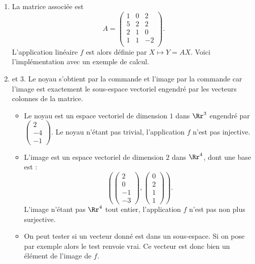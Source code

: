\documentclass[class=report,crop=false]{standalone}
\begin{document}
\begin{enumerate}
  \item La matrice associée est
  $$A = \begin{pmatrix}1&0&2\\5&2&2\\2&1&0\\1&1&-2\\\end{pmatrix}.$$
  L'application linéaire $f$ est alors définie par $X \mapsto Y = AX$.
  Voici l'implémentation avec un exemple de calcul. 
 
  \item et 3.
  Le noyau s'obtient par la commande  et l'image par la commande
   car l'image est
  exactement le sous-espace vectoriel engendré par les vecteurs colonnes de la matrice.
  
  \begin{itemize}
    \item Le noyau est un espace vectoriel de dimension $1$ dans $\Rr^3$ engendré par 
  $\begin{pmatrix}2\\-4\\-1\end{pmatrix}$. 
  Le noyau n'étant pas trivial, l'application $f$ n'est pas injective.
  
    \item   L'image est un espace vectoriel de dimension $2$ dans $\Rr^4$, dont une base   
  est :
  $$\left( 
  \begin{pmatrix}2\\0\\-1\\ -3\end{pmatrix},
  \begin{pmatrix}0\\2\\ 1\\ 1\end{pmatrix}\right).$$
  L'image n'étant pas $\Rr^4$ tout entier, l'application $f$ n'est pas non plus surjective.
  
    \item On peut tester si un vecteur donné est dans un sous-espace. Si on pose par exemple 
       alors le test \og {} \fg{}
      renvoie vrai. Ce vecteur est donc bien un élément de l'image de $f$. 
  \end{itemize}
 
\end{enumerate}
\end{document}

